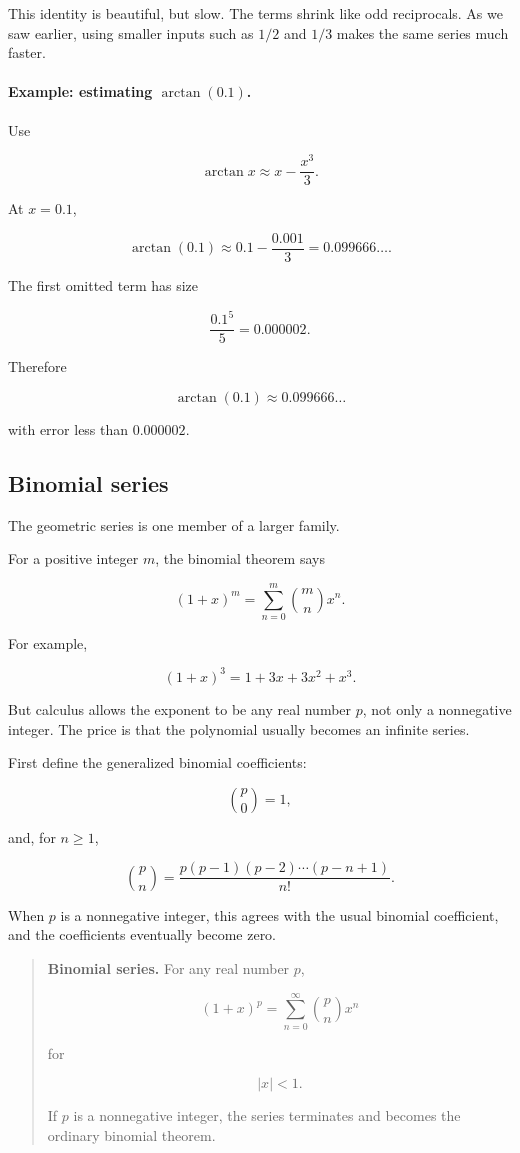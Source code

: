 This identity is beautiful, but slow.  The terms shrink like odd reciprocals.  As we saw
earlier, using smaller inputs such as \(1/2\) and \(1/3\) makes the same series much
faster.

\paragraph{Example: estimating \(\arctan(0.1)\).}
Use

\[
\arctan x\approx x-\frac{x^3}{3}.
\]

At \(x=0.1\),

\[
\arctan(0.1)
\approx
0.1-\frac{0.001}{3}
=
0.099666\ldots.
\]

The first omitted term has size

\[
\frac{0.1^5}{5}
=
0.000002.
\]

Therefore

\[
\boxed{
\arctan(0.1)\approx0.099666\ldots
}
\]

with error less than \(0.000002\).

\subsection{Binomial series}
\label{subsec:binomial-series}

The geometric series is one member of a larger family.

For a positive integer \(m\), the binomial theorem says

\[
(1+x)^m
=
\sum_{n=0}^{m}
\binom{m}{n}x^n.
\]

For example,

\[
(1+x)^3=1+3x+3x^2+x^3.
\]

But calculus allows the exponent to be any real number \(p\), not only a nonnegative
integer.  The price is that the polynomial usually becomes an infinite series.

First define the generalized binomial coefficients:

\[
\binom{p}{0}=1,
\]

and, for \(n\ge1\),

\[
\boxed{
\binom{p}{n}
=
\frac{p(p-1)(p-2)\cdots(p-n+1)}{n!}.
}
\]

When \(p\) is a nonnegative integer, this agrees with the usual binomial coefficient,
and the coefficients eventually become zero.

\begin{quote}
\textbf{Binomial series.}
For any real number \(p\),

\[
\boxed{
(1+x)^p
=
\sum_{n=0}^{\infty}
\binom{p}{n}x^n
}
\]

for

\[
\boxed{|x|<1.}
\]

If \(p\) is a nonnegative integer, the series terminates and becomes the ordinary
binomial theorem.
\end{quote}

